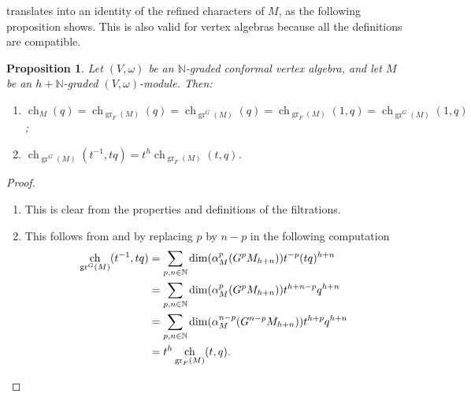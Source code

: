 \documentclass[a4paper, 12pt, reqno]{amsart}
\newtheorem{proposition}[theorem]{Proposition}
\theoremstyle{remark}
\DeclareMathOperator{\gr}{gr}
\DeclareMathOperator{\ch}{ch}
\begin{document}
 translates into an identity of the refined characters of $M$, as the following proposition shows.
This is also valid for vertex algebras because all the definitions are compatible.

\begin{proposition}
  \label{prp:19}
  Let $(V, \omega)$ be an $\mathbb{N}$-graded conformal vertex algebra, and let $M$ be an $h + \mathbb{N}$-graded $(V, \omega)$-module.
  Then:
  \begin{enumerate}
  \item $\ch_M(q) = \ch_{\gr_F(M)}(q) = \ch_{\gr^G(M)}(q) = \ch_{\gr_F(M)}(1, q) = \ch_{\gr^G(M)}(1, q)$;
  \item $\ch_{\gr^G(M)}(t^{-1}, tq) = t^h\ch_{\gr_F(M)}(t, q)$.
  \end{enumerate}
\end{proposition}

\begin{proof}\leavevmode
  \begin{enumerate}
  \item This is clear from the properties and definitions of the filtrations.
  \item This follows from  and by replacing $p$ by $n - p$ in the following computation
    \begin{align*}
      \ch_{\gr^G(M)}(t^{-1}, tq) &= \sum_{p, n \in \mathbb{N}}\dim(\alpha^p_M(G^pM_{h + n}))t^{-p}(tq)^{h + n} \\
                                 &= \sum_{p, n \in \mathbb{N}}\dim(\alpha^p_M(G^pM_{h + n}))t^{h + n - p}q^{h + n} \\
                                 &= \sum_{p, n \in \mathbb{N}}\dim(\alpha^{n - p}_M(G^{n - p}M_{h + n}))t^{h + p}q^{h + n} \\
                                 &= t^h\ch_{\gr_F(M)}(t, q). \qedhere
    \end{align*}
  \end{enumerate}
\end{proof}
\end{document}
